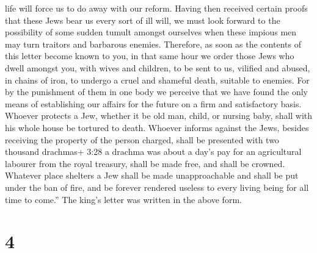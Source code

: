 life will force us to do away with our reform.  Having then
received certain proofs that these Jews bear us every sort of ill will,
we must look forward to the possibility of some sudden tumult amongst
ourselves when these impious men may turn traitors and barbarous
enemies.  Therefore, as soon as the contents of this letter
become known to you, in that same hour we order those Jews who dwell
amongst you, with wives and children, to be sent to us, vilified and
abused, in chains of iron, to undergo a cruel and shameful death,
suitable to enemies.  For by the punishment of them in one
body we perceive that we have found the only means of establishing our
affairs for the future on a firm and satisfactory basis. 
Whoever protects a Jew, whether it be old man, child, or nursing baby,
shall with his whole house be tortured to death.  Whoever
informs against the Jews, besides receiving the property of the person
charged, shall be presented with two thousand drachmas+ 3:28 a drachma
was about a day's pay for an agricultural labourer from the royal
treasury, shall be made free, and shall be crowned. 
Whatever place shelters a Jew shall be made unapproachable and shall be
put under the ban of fire, and be forever rendered useless to every
living being for all time to come.''  The king's letter was
written in the above form.

\hypertarget{section-3}{%
\section{4}\label{section-3}}

